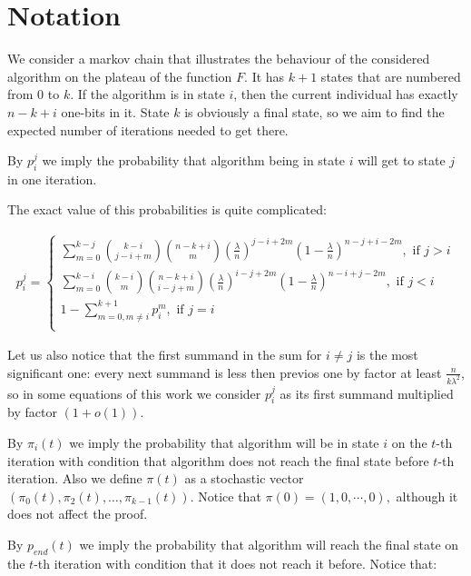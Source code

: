 \documentclass{article}
\begin{document}
\section{Notation}

We consider a markov chain that illustrates the behaviour of the considered algorithm on the plateau of the function $F$. It has $k + 1$ states that are numbered from $0$ to $k$. If the algorithm is in state $i$, then the current individual has exactly $n - k + i$ one-bits in it. State $k$ is obviously a final state, so we aim to find the expected number of iterations needed to get there.

By $p_i^j$ we imply the probability that algorithm being in state $i$ will get to state $j$ in one iteration.

The exact value of this probabilities is quite complicated:

\begin{align*}
  p_i^j = \begin{cases}
    \sum\limits_{m = 0}^{k - j} \binom{k - i}{j - i + m} \binom{n - k + i}{m} \left(\frac{\lambda}{n}\right)^{j - i + 2m} \left(1 - \frac{\lambda}{n}\right)^{n - j + i - 2m}, \text{ if } j > i \\
      \sum\limits_{m = 0}^{k - i} \binom{k - i}{m} \binom{n - k + i}{i - j + m} \left(\frac{\lambda}{n}\right)^{i - j + 2m} \left(1 - \frac{\lambda}{n}\right)^{n - i + j - 2m}, \text{ if } j < i \\
      1 - \sum\limits_{m = 0, m \ne i}^{k + 1} p_i^m, \text{ if } j = i \\
  \end{cases}
\end{align*}

Let us also notice that the first summand in the sum for $i \ne j$ is the most significant one: every next summand is less then previos one by factor at least $\frac{n}{k\lambda^2}$, so in some equations of this work we consider $p_i^j$ as its first summand multiplied by factor $(1 + o(1)).$

By $\pi_i(t)$ we imply the probability that algorithm will be in state $i$ on the $t$-th iteration with condition that algorithm does not reach the final state before $t$-th iteration. Also we define $\pi(t)$ as a stochastic vector $(\pi_0(t), \pi_2(t), \dots, \pi_{k - 1}(t)).$ Notice that $\pi(0) = (1, 0, \cdots, 0),$ although it does not affect the proof.

By $p_{end}(t)$ we imply the probability that algorithm will reach the final state on the $t$-th iteration with condition that it does not reach it before. Notice that:
\end{document}
